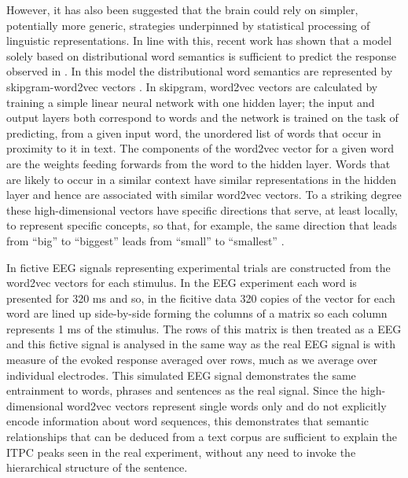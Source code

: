 \documentclass[10pt,letterpaper]{article}
\newcommand{\citet}[1]{\cite{#1}}
\begin{document}
However, it has also been suggested that the brain could rely on
simpler, potentially more generic, strategies underpinned by
statistical processing of linguistic representations. In line with
this, recent work \cite{FrankYang2018} has shown that a model solely
based on distributional word semantics is sufficient to predict the
response observed in \cite{DingEtAl2016, DingEtAl2017}. In this model
the distributional word semantics are represented by skipgram-word2vec
vectors \cite{MikolovEtAl2013,Bojanowski2017}. In skipgram, word2vec
vectors are calculated by training a simple linear neural network with
one hidden layer; the input and output layers both correspond to words
and the network is trained on the task of predicting, from a given
input word, the unordered list of words that occur in proximity to it
in text. The components of the word2vec vector for a given word are
the weights feeding forwards from the word to the hidden layer. Words
that are likely to occur in a similar context have similar
representations in the hidden layer and hence are associated with
similar word2vec vectors. To a striking degree these high-dimensional
vectors have specific directions that serve, at least locally, to
represent specific concepts, so that, for example, the same direction
that leads from ``big'' to ``biggest'' leads from ``small'' to
``smallest'' \cite{MikolovEtAl2013b, MikolovEtAl2013c}.

In \citet{FrankYang2018} fictive EEG signals representing experimental
trials are constructed from the word2vec vectors for each stimulus. In
the EEG experiment each word is presented for 320 ms and so, in the
ficitive data 320 copies of the vector for each word are lined up
side-by-side forming the columns of a matrix so each column
represents 1 ms of the stimulus. The rows of this matrix is then
treated as a EEG and this fictive signal is analysed in the same way
as the real EEG signal is with measure of the evoked response averaged
over rows, much as we average over individual electrodes. This
simulated EEG signal demonstrates the same entrainment to words,
phrases and sentences as the real signal. Since the high-dimensional
word2vec vectors represent single words only and do not explicitly
encode information about word sequences, this demonstrates that
semantic relationships that can be deduced from a text corpus are
sufficient to explain the ITPC peaks seen in the real experiment, without
any need to invoke the hierarchical structure of the sentence.
\end{document}
